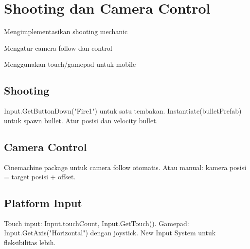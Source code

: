 \section{Shooting dan Camera Control}

\begin{learningoutcomes}
\item Mengimplementasikan shooting mechanic
\item Mengatur camera follow dan control
\item Menggunakan touch/gamepad untuk mobile
\end{learningoutcomes}

\subsection{Shooting}

Input.GetButtonDown("Fire1") untuk satu tembakan. Instantiate(bulletPrefab) untuk spawn bullet. Atur posisi dan velocity bullet.

\subsection{Camera Control}

Cinemachine package untuk camera follow otomatis. Atau manual: kamera posisi = target posisi + offset.

\subsection{Platform Input}

Touch input: Input.touchCount, Input.GetTouch(). Gamepad: Input.GetAxis("Horizontal") dengan joystick. New Input System untuk fleksibilitas lebih.
